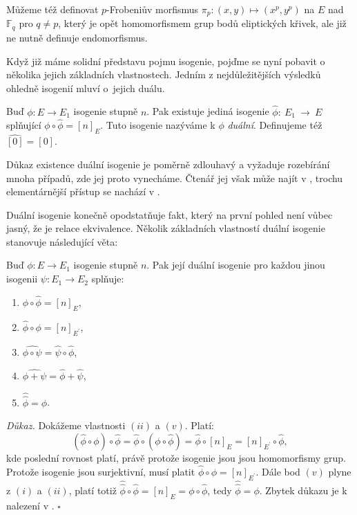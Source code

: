 \documentclass[12pt]{report}
\begin{document}
Můžeme též definovat $p$-Frobeniův morfismus $\pi_p : (x,y) \mapsto (x^p,y^p)$ na $E$ nad $\mathbb{F}_q$ pro $q \neq p$, který je opět homomorfismem grup bodů eliptických křivek, ale již ne nutně definuje endomorfismus.

Když již máme solidní představu pojmu isogenie, pojďme se nyní pobavit o několika jejich základních vlastnostech. Jedním z nejdůležitějších výsledků ohledně isogenií mluví o~jejich duálu.

\begin{veta}
Buď $\phi: E \longrightarrow E_1$ isogenie stupně $n$. Pak existuje jediná isogenie $\hat{\phi}:~E_1~\longrightarrow~E$ splňující $\phi \circ \hat{\phi} = [n]_E$. Tuto isogenie nazýváme k $\phi$ \textit{duální}. Definujeme též $\hat{[0]} = [0]$.
\end{veta}
Důkaz existence duální isogenie je poměrně zdlouhavý a vyžaduje rozebírání mnoha případů, zde jej proto vynecháme. Čtenář jej však může najít v \cite[Thm. III.6.1.]{Silverman}, trochu elementárnější přístup se nachází v \cite[Thm. 7.8.]{Sutherland}.

Duální isogenie konečně opodstatňuje fakt, který na první pohled není vůbec jasný, že  je relace ekvivalence. Několik základních vlastností duální isogenie stanovuje následující věta:

\begin{veta}\label{dual}
Buď $\phi: E \longrightarrow E_1$ isogenie stupně $n$. Pak její duální isogenie pro každou jinou isogenii $\psi:E_1 \longrightarrow E_2$ splňuje:
\begin{enumerate}
\item $\phi \circ \hat{\phi} = [n]_E$,
\item $\hat{\phi} \circ \phi = [n]_{E^\prime}$,
\item $\widehat{\phi \circ \psi} = \hat{\psi} \circ \hat{\phi}$,
\item $\widehat{\phi + \psi} = \hat{\phi} + \hat{\psi}$,
\item $\hat{\hat{\phi} } = \phi $.
\end{enumerate} 
\end{veta}

\noindent \textit{Důkaz.} Dokážeme vlastnosti $(ii)$ a $(v)$. Platí:
\begin{equation*}
(\hat{\phi} \circ \phi) \circ \hat{\phi} = \hat{\phi} \circ (\phi \circ \hat{\phi}) = \hat{\phi} \circ [n]_{E} = [n]_{E^\prime} \circ \hat{\phi},
\end{equation*}
kde poslední rovnost platí, právě protože isogenie jsou jsou homomorfismy grup. Protože isogenie jsou surjektivní, musí platit $\hat{\phi} \circ \phi = [n]_{E^\prime}$. Dále bod $(v)$ plyne z $(i)$ a $(ii)$, platí totiž $\hat{ \hat{\phi}} \circ \hat{\phi}  = [n]_{E} = \phi \circ \hat{\phi}$, tedy $\hat{\hat{\phi}} = \phi$. Zbytek důkazu je k nalezení v \cite[Thm. III.6.1]{Silverman}. \hfill $\square$\\
\end{document}
